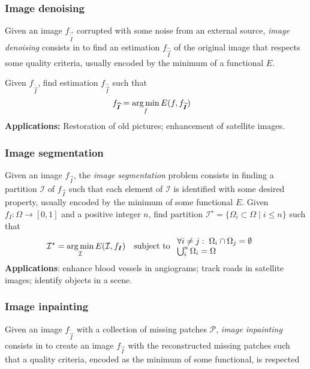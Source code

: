 \subsubsection{Image denoising}
Given an image $f_{\vec{\widetilde{I}}}$ corrupted with some noise from an external source, \emph{image denoising} consists in to find an estimation $f_{\widehat{\vec{I}}}$ of the original image that respects some quality criteria, usually encoded by the minimum of a functional $E$. 

Given $f_{\widetilde{\vec{I}}}$, find estimation $f_{\widehat{\vec{I}}}$ such that
\begin{align*}
	f_{\widehat{\bm{I}}} &= \operatorname*{arg\,min}_f E(f,f_{\bm{\widetilde{I}}})
\end{align*}
%
\textbf{Applications:} Restoration of old pictures; enhancement of satellite images.

\subsubsection{Image segmentation}
Given an image $f_{\vec{I}}$, the \emph{image segmentation} problem consists in finding a partition $\mathcal{I}$ of $f_{\vec{I}}$ such that each element of $\mathcal{I}$ is identified with some desired property, usually encoded by the minimum of some functional $E$.
%
%
Given $f_I:\Omega \rightarrow [0,1]$ and a positive integer $n$, find partition $\mathcal{I}^{\star} = \{ \Omega_i \subset \Omega \; | \; i \leq n \}$ such that
\begin{align*}
	\mathcal{I}^{\star} = \operatorname*{arg\,min}_{\mathcal{I}} E(\mathcal{I},f_{\bm{I}}) &\quad  \text{subject to } \begin{array}{l}
	\forall i\neq j:\; \Omega_i \cap \Omega_j = \emptyset\\ 
	\bigcup_i^{n} \Omega_i = \Omega
	\end{array}
\end{align*}
%
\textbf{Applications}: enhance blood vessels in angiograms; track roads in satellite images; identify objects in a scene. 



\subsubsection{Image inpainting}
Given an image $f_{\widetilde{\vec{I}}}$ with a collection of missing patches $\mathcal{P}$, \emph{image inpainting} consists in to create an image $f_{\vec{I}}$ with the reconstructed missing patches such that a quality criteria, encoded as the minimum of some functional, is respected

